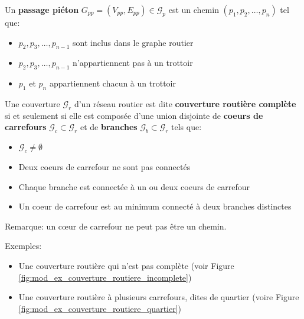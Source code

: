 \begin{definition}
    Un \textbf{passage piéton} $G_{pp} = (V_{pp}, E_{pp}) \in \mathcal{G}_p$ est un chemin $(p_1, p_2,\dots, p_n)$ tel que:

    \begin{itemize}
        \item $p_2, p_3, \dots, p_{n-1}$ sont inclus dans le graphe routier
        \item $p_2, p_3, \dots, p_{n-1}$ n'appartiennent pas à un trottoir
        \item $p_1$ et $p_n$ appartiennent chacun à un trottoir
    \end{itemize}
\end{definition}

\begin{definition}
    Une couverture $\mathcal{G}_r$ d'un réseau routier est dite \textbf{couverture routière complète} si et seulement si elle est composée d'une union disjointe de \textbf{coeurs de carrefours} $\mathcal{G}_c \subset \mathcal{G}_r$ et de \textbf{branches} $\mathcal{G}_b \subset \mathcal{G}_r$ tels que:

    \begin{itemize}
        \item $\mathcal{G}_c \neq \emptyset$ 
        \item Deux coeurs de carrefour ne sont pas connectés
        \item Chaque branche est connectée à un ou deux coeurs de carrefour
        \item Un coeur de carrefour est au minimum connecté à deux branches distinctes
    \end{itemize}
    \label{def:modelisation_couverture_routiere_complète}
\end{definition}

\noindent
Remarque: un cœur de carrefour ne peut pas être un chemin.

\noindent
Exemples:
\begin{itemize}
    \item Une couverture routière qui n'est pas complète (voir Figure \ref{fig:mod_ex_couverture_routiere_incomplete})
    \item Une couverture routière à plusieurs carrefours, dites de quartier (voire Figure \ref{fig:mod_ex_couverture_routiere_quartier})
\end{itemize}

